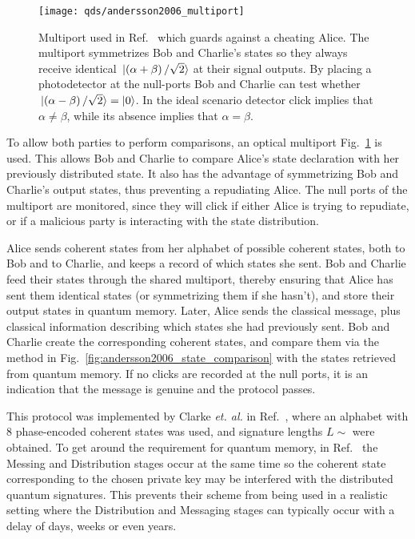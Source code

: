 \begin{figure}[htp]
\centering
\texttt{[image: qds/andersson2006\_multiport]}
\caption{\label{fig:andersson2006_multiport} Multiport used in Ref.~\cite{Andersson2006} which guards against a cheating Alice. The multiport symmetrizes Bob and Charlie's states so they always receive identical $\ket*{\left(\alpha+\beta\right)/\sqrt{2}}$ at their signal outputs. By placing a photodetector at the null-ports Bob and Charlie can test whether $\ket*{\left(\alpha-\beta\right)/\sqrt{2}} = \ket{0}$. In the ideal scenario detector click implies that $\alpha\ne\beta$, while its absence implies that $\alpha = \beta$. }
\end{figure}

To allow both parties to perform comparisons, an optical multiport Fig.~\ref{fig:andersson2006_multiport} is used. This allows Bob and Charlie to compare Alice's state declaration with her previously distributed state. It also has the advantage of symmetrizing Bob and Charlie's output states, thus preventing a repudiating Alice. The null ports of the multiport are monitored, since they will click if either Alice is trying to repudiate, or if a malicious party is interacting with the state distribution.

Alice sends coherent states from her alphabet of possible coherent states, both to Bob and to Charlie, and keeps a record of which states she sent. Bob and Charlie feed their states through the shared multiport, thereby ensuring that Alice has sent them identical states (or symmetrizing them if she hasn't), and store their output states in quantum memory. Later, Alice sends the classical message, plus classical information describing which states she had previously sent. Bob and Charlie create the corresponding coherent states, and compare them via the method in Fig.~\ref{fig:andersson2006_state_comparison} with the states retrieved from quantum memory. If no clicks are recorded at the null ports, it is an indication that the message is genuine and the protocol passes.

This protocol was implemented by Clarke \emph{et. al.} in Ref.~\cite{Clarke2012}, where an alphabet with $8$ phase-encoded coherent states was used, and signature lengths $L \sim $ were obtained.  To get around the requirement for quantum memory, in Ref.~\cite{Clarke2012} the Messing and Distribution stages occur at the same time so the coherent state corresponding to the chosen private key may be interfered with the distributed quantum signatures. This prevents their scheme from being used in a realistic setting where the Distribution and Messaging stages can typically occur with a delay of days, weeks or even years.





